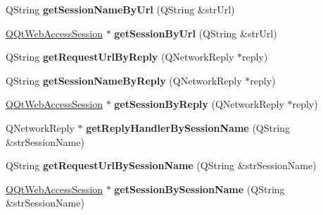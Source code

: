\begin{DoxyCompactItemize}
\item 
\mbox{\label{class_q_qt_web_access_session_manager_a191a68836503d64c6966a1e44c9398ba}} 
Q\+String {\bfseries get\+Session\+Name\+By\+Url} (Q\+String \&str\+Url)
\item 
\mbox{\label{class_q_qt_web_access_session_manager_acbdd227173a3ad7564eb98b3d4dba4f3}} 
\mbox{\hyperlink{class_q_qt_web_access_session}{Q\+Qt\+Web\+Access\+Session}} $\ast$ {\bfseries get\+Session\+By\+Url} (Q\+String \&str\+Url)
\item 
\mbox{\label{class_q_qt_web_access_session_manager_a9f8b11b163379e770de652b62be12692}} 
Q\+String {\bfseries get\+Request\+Url\+By\+Reply} (Q\+Network\+Reply $\ast$reply)
\item 
\mbox{\label{class_q_qt_web_access_session_manager_a3bf0e1c691f94107a8646bda2031ed07}} 
Q\+String {\bfseries get\+Session\+Name\+By\+Reply} (Q\+Network\+Reply $\ast$reply)
\item 
\mbox{\label{class_q_qt_web_access_session_manager_a2944779a539af5ff037224e039680ff5}} 
\mbox{\hyperlink{class_q_qt_web_access_session}{Q\+Qt\+Web\+Access\+Session}} $\ast$ {\bfseries get\+Session\+By\+Reply} (Q\+Network\+Reply $\ast$reply)
\item 
\mbox{\label{class_q_qt_web_access_session_manager_a4e4e2ee8dab5767ac64a9c0adcde8f8e}} 
Q\+Network\+Reply $\ast$ {\bfseries get\+Reply\+Handler\+By\+Session\+Name} (Q\+String \&str\+Session\+Name)
\item 
\mbox{\label{class_q_qt_web_access_session_manager_aa426a2e5878f58ef8d063ccdbcfe593c}} 
Q\+String {\bfseries get\+Request\+Url\+By\+Session\+Name} (Q\+String \&str\+Session\+Name)
\item 
\mbox{\label{class_q_qt_web_access_session_manager_ad1b88d752fe63fcfda44cdeabcc290ce}} 
\mbox{\hyperlink{class_q_qt_web_access_session}{Q\+Qt\+Web\+Access\+Session}} $\ast$ {\bfseries get\+Session\+By\+Session\+Name} (Q\+String \&str\+Session\+Name)

\end{DoxyCompactItemize}
